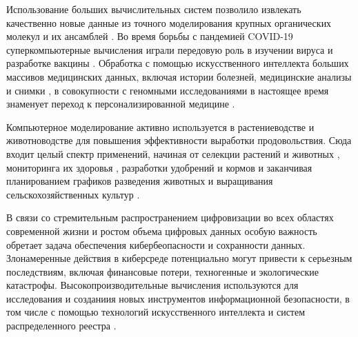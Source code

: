 Использование больших вычислительных систем позволило извлекать качественно новые данные из точного моделирования крупных органических молекул и их ансамблей \cite{Teplukhin2009SuperBigMolec}.
Во время борьбы с пандемией COVID-19 суперкомпьютерные вычисления играли передовую роль в изучении вируса и разработке вакцины \cite{Colonnelli2021SuperCovid}.
Обработка с помощью искусственного интеллекта больших массивов медицинских данных, включая истории болезней, медицинские анализы и снимки \cite{Ri2024SuperXRay}, в совокупности с геномными исследованиями в настоящее время знаменует переход к персонализированной медицине \cite{Kishore2024SuperPrecMed}.

Компьютерное моделирование активно используется в растениеводстве и животноводстве для повышения эффективности выработки продовольствия.
Сюда входит целый спектр применений, начиная от селекции растений и животных \cite{Ahmetshina2020SuperSelection}, мониторинга их здоровья \cite{Mourant2018SuperEpi}, разработки удобрений и кормов \cite{Irfan2016SuperFert} и заканчивая планированием графиков разведения животных и выращивания сельскохозяйственных культур \cite{Zhang2021SuperFertPlan}.

В связи со стремительным распространением цифровизации во всех областях современной жизни и ростом объема цифровых данных особую важность обретает задача обеспечения кибербеопасности и сохранности данных.
Злонамеренные действия в киберсреде потенциально могут привести к серьезным последствиям, включая финансовые потери, техногенные и экологические катастрофы.
Высокопроизводительные вычисления используются для исследования и созданиия новых инструментов информационной безопасности, в том числе с помощью технологий искусственного интеллекта и систем распределенного реестра \cite{Terziyska2024SuperCyber}.

